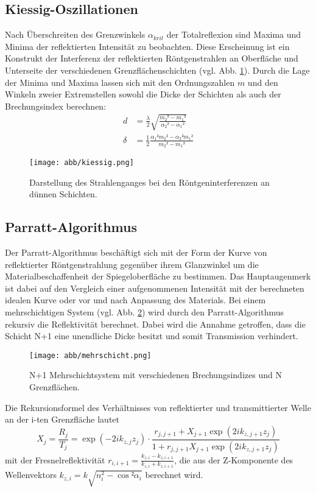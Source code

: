 \subsection{Kiessig-Oszillationen}
Nach Überschreiten des Grenzwinkels $\alpha_{krit}$ der Totalreflexion sind Maxima und Minima der reflektierten Intensität zu beobachten.
Diese Erscheinung ist ein Konstrukt der Interferenz der reflektierten Röntgenstrahlen an Oberfläche und Unterseite der verschiedenen Grenzflächenschichten (vgl. Abb. \ref{fig:kiessig}).
Durch die Lage der Minima und Maxima lassen sich mit den Ordnungszahlen $m$ und den Winkeln zweier Extremstellen sowohl die Dicke der Schichten als auch der Brechungsindex berechnen: \cite{kiessig}
\begin{align}
    d &= \frac{\lambda}{2}\sqrt{\frac{m_2²-m_1²}{\alpha_2²-\alpha_1²}} \\
    \delta &= \frac{1}{2}\frac{\alpha_1² m_2² - \alpha_2² m_1²}{m_2²-m_1²}
\end{align}

\begin{figure}
    \center
    \texttt{[image: abb/kiessig.png]}
    \caption{Darstellung des Strahlenganges bei den Röntgeninterferenzen an dünnen Schichten. \cite{kiessig}}
    \label{fig:kiessig}
\end{figure}

\subsection{Parratt-Algorithmus}
Der Parratt-Algorithmus beschäftigt sich mit der Form der Kurve von reflektierter Röntgenstrahlung gegenüber ihrem Glanzwinkel um die Materialbeschaffenheit der Spiegeloberfläche zu bestimmen.
Das Hauptaugenmerk ist dabei auf den Vergleich einer aufgenommenen Intensität mit der berechneten idealen Kurve oder vor und nach Anpassung des Materials.
Bei einem mehrschichtigen System (vgl. Abb. \ref{fig:mehrschicht}) wird durch den Parratt-Algorithmus rekursiv die Reflektivität berechnet.
Dabei wird die Annahme getroffen, dass die Schicht N+1 eine unendliche Dicke besitzt und somit Transmission verhindert.
\begin{figure}
    \center
    \texttt{[image: abb/mehrschicht.png]}
    \caption{N+1 Mehrschichtsystem mit verschiedenen Brechungsindizes und N Grenzflächen. \cite{Stettner}}
    \label{fig:mehrschicht}
\end{figure}
Die Rekursionsformel des Verhältnisses von reflektierter und transmittierter Welle an der i-ten Grenzfläche lautet
\begin{equation}
    X_{j}=\frac{R_{j}}{T_{j}}=\exp \left(-2 i k_{z, j} z_{j}\right) \cdot \frac{r_{j, j+1}+X_{j+1} \exp \left(2 i k_{z, j+1} z_{j}\right)}{1+r_{j, j+1} X_{j+1} \exp \left(2 i k_{z, j+1} z_{j}\right)}
\end{equation}
mit der Fresnelreflektivität $r_{i,i+1} = \frac{k_{z,i}-k_{z,i+1}}{k_{z,i}+k_{z,i+1}}$, die aus der Z-Komponente des Wellenvektors $k_{z,i}=k\sqrt{n^2_i - \cos²\alpha_i}$ berechnet wird.

